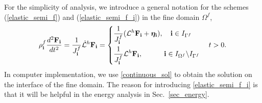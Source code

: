 For the simplicity of analysis, we introduce a general notation for the schemes (\ref{elastic_semi_f}) and (\ref{elastic_semi_f_i}) in the fine domain $\Omega^f$,
\begin{align}\label{fine_scheme}
{\rho}^f_{\bf i}\frac{d^2{\bf F}_{\bf i}}{dt^2} =\frac{1}{J^f_{\bf i}}\hat{\mathcal{L}}^h{\bf F}_{\bf i} = \left\{
\begin{aligned}
&\frac{1}{J^f_{\bf i}}(\mathcal{L}^h{\bf F}_{\bf i} +{\bm \eta}_{\bf i}), \quad {\bf i}\in I_{\Gamma^f}\\
&\frac{1}{J^f_{\bf i}}\mathcal{L}^h{\bf F}_{\bf i},\quad\quad\quad {\bf i}\in I_{\Omega^f}\backslash I_{\Gamma^f} 
\end{aligned}
\right. \quad t > 0.
\end{align}
In computer implementation, we use \eqref{continuous_sol} to obtain the solution on the interface of the fine domain. The reason for introducing    \eqref{elastic_semi_f_i} is that it will be helpful in the energy analysis in Sec.~\ref{sec_energy}.

